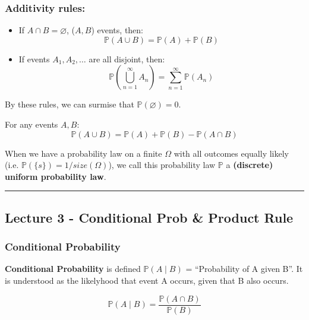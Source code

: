 \documentclass{article}
\begin{document}
\bigskip
\subsubsection{Additivity rules:}

\begin{itemize}
\item If $A \cap B = \varnothing$, ($A, B$) events, then:
  \begin{equation}
    \boxed{
      \mathbb{P}(A \cup B) = \mathbb{P}(A) + \mathbb{P}(B)
    }
  \end{equation}

\item If events $A_1, A_2, \dots$ are all disjoint, then:
  \begin{equation}
    \boxed{
      \mathbb{P} (\bigcup\limits_{n=1}^{\infty} A_n) =
      \sum_{n=1}^{\infty} \mathbb{P}(A_n)
    }
  \end{equation}
\end{itemize}

By these rules, we can surmise that $\boxed{\mathbb{P} (\varnothing) =
  0}$.

For any events $A, B$:
\begin{equation}
  \tag{Event Union}
  \boxed{
    \mathbb{P}(A \cup B) = \mathbb{P}(A) + \mathbb{P}(B) -
    \mathbb{P}(A \cap B)
  }
\end{equation}

When we have a probability law on a finite $\Omega$ with all outcomes
equally likely (i.e. $\mathbb{P}(\{s\}) = 1/size(\Omega)$), we call
this probability law $\mathbb{P}$ a \textbf{(discrete) uniform
  probability law}.


\medskip \hrule
\subsection{Lecture 3 - Conditional Prob \& Product Rule}

\subsubsection{Conditional Probability}

\textbf{Conditional Probability} is defined $\mathbb{P}(A \mid B)$ =
``Probability of A given B''. It is understood as the likelyhood that
event A occurs, given that B also occurs. 

\begin{equation}
  \tag{Conditional Probability Def}
  \boxed{
    \mathbb{P}(A \mid B) = \frac{\mathbb{P}(A \cap B)}{\mathbb{P}(B)}
  }
\end{equation}
\end{document}

